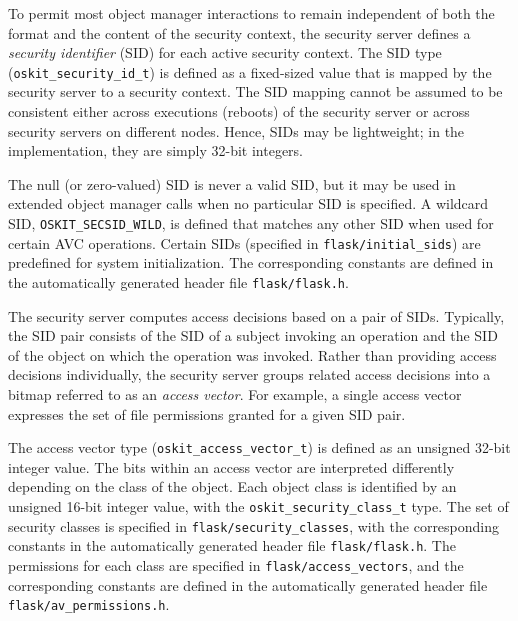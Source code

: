 To permit most object manager interactions to remain independent of
both the format and the content of the security context, the security
server defines a \emph{security identifier} (SID) for each active
security context. The SID type (\texttt{oskit_security_id_t}) 
is defined as a fixed-sized value that
is mapped by the security server to a security context.  The SID
mapping cannot be assumed to be consistent either across executions
(reboots) of the security server or across security servers on
different nodes.  Hence, SIDs may be lightweight; in the
implementation, they are simply 32-bit integers.

The null (or zero-valued) SID is never a
valid SID, but it may be used in extended object manager calls 
when no particular SID is specified.  A wildcard SID, 
\texttt{OSKIT_SECSID_WILD}, is defined that matches any other 
SID when used for certain AVC operations.  Certain SIDs (specified
in \texttt{flask/initial_sids}) are predefined for system
initialization.  The corresponding constants are defined in
the automatically generated header file \texttt{flask/flask.h}.

The security server computes access decisions based on a pair of SIDs.
Typically, the SID pair consists of the SID of a subject invoking an
operation and the SID of the object on which the operation was
invoked.  Rather than providing access decisions individually, the
security server groups related access decisions into a bitmap referred
to as an \emph{access vector}. For example, a single access vector
expresses the set of file permissions granted for a given SID pair.

The access vector type (\texttt{oskit_access_vector_t}) is defined
as an unsigned 32-bit integer value.  The bits within an access vector 
are interpreted differently depending on the class of the object.  
Each object class is identified by an unsigned 16-bit integer value, 
with the \texttt{oskit_security_class_t} type.  The set of security
classes is specified in \texttt{flask/security_classes}, with
the corresponding constants in the automatically generated
header file \texttt{flask/flask.h}.  The permissions for
each class are specified in \texttt{flask/access_vectors},
and the corresponding constants are defined in the
automatically generated header file
\texttt{flask/av_permissions.h}.

\label{oskit-security}

